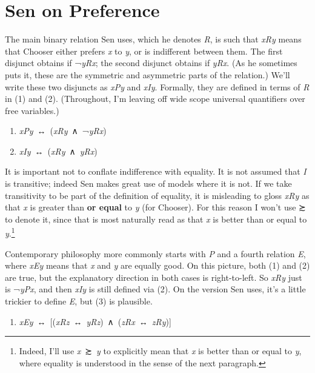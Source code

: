\documentclass[
  11pt,
  letterpaper,
  DIV=11,
  numbers=noendperiod,
  twoside]{scrartcl}
\providecommand{\tightlist}{%
  \setlength{\itemsep}{0pt}\setlength{\parskip}{0pt}}
\begin{document}
\section{Sen on Preference}\label{sec-sen}

The main binary relation Sen uses, which he denotes \emph{R}, is such
that \emph{xRy} means that Chooser either prefers \emph{x} to \emph{y},
or is indifferent between them. The first disjunct obtains if
¬\emph{yRx}; the second disjunct obtains if \emph{yRx}. (As he sometimes
puts it, these are the symmetric and asymmetric parts of the relation.)
We'll write these two disjuncts as \emph{xPy} and \emph{xIy}. Formally,
they are defined in terms of \emph{R} in (1) and (2). (Throughout, I'm
leaving off wide scope universal quantifiers over free variables.)

\begin{enumerate}
\def\labelenumi{(\arabic{enumi})}
\tightlist
\item
  \emph{xPy}~↔︎~(\emph{xRy}~∧~¬\emph{yRx})
\item
  \emph{xIy}~↔︎~(\emph{xRy}~∧~\emph{yRx})
\end{enumerate}

It is important not to conflate indifference with equality. It is not
assumed that \emph{I} is transitive; indeed Sen makes great use of
models where it is not. If we take transitivity to be part of the
definition of equality, it is misleading to gloss \emph{xRy} as that
\emph{x} is greater than \textbf{or equal} to \emph{y} (for Chooser).
For this reason I won't use ≿ to denote it, since that is most naturally
read as that \emph{x} is better than or equal to \emph{y}.\footnote{Indeed,
  I'll use \emph{x}~≿~\emph{y} to explicitly mean that \emph{x} is
  better than or equal to \emph{y}, where equality is understood in the
  sense of the next paragraph.}

Contemporary philosophy more commonly starts with \emph{P} and a fourth
relation \emph{E}, where \emph{xEy} means that \emph{x} and \emph{y} are
equally good. On this picture, both (1) and (2) are true, but the
explanatory direction in both cases is right-to-left. So \emph{xRy} just
is ¬\emph{yPx}, and then \emph{xIy} is still defined via (2). On the
version Sen uses, it's a little trickier to define \emph{E}, but (3) is
plausible.

\begin{enumerate}
\def\labelenumi{(\arabic{enumi})}
\setcounter{enumi}{2}
\tightlist
\item
  \emph{xEy}~↔︎~{[}(\emph{xRz}~↔︎~\emph{yRz})~∧~(\emph{zRx}~↔︎~\emph{zRy}){]}
\end{enumerate}
\end{document}
